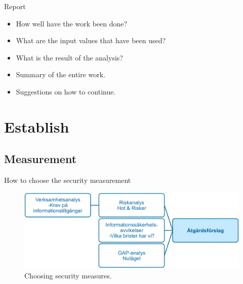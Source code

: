 \documentclass{beamer}
\begin{document}
\begin{frame}{Report}
  \begin{itemize}
    \item How well have the work been done?
    \item What are the input values that have been used?
    \item What is the result of the analysis?
    \item Summary of the entire work.
    \item Suggestions on how to continue.
  \end{itemize}
\end{frame}

\section{Establish}

\subsection{Measurement}

\begin{frame}{How to choose the security measurement}
  \begin{figure}
    \includegraphics[width=\textwidth]{msb-atgarder.png}
    \caption{Choosing security measures.}
  \end{figure}
\end{frame}
\end{document}
